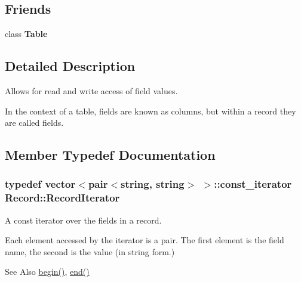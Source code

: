 \subsection*{Friends}
\begin{DoxyCompactItemize}
\item 
\hypertarget{class_record_af888815e80064bc9fa1035c6265da86e}{class {\bfseries Table}}\label{class_record_af888815e80064bc9fa1035c6265da86e}

\end{DoxyCompactItemize}


\subsection{Detailed Description}
Allows for read and write access of field values.

In the context of a table, fields are known as columns, but within a record they are called fields. 

\subsection{Member Typedef Documentation}
\hypertarget{class_record_ae8a1c90a4d896429d087ccc1f205f9b7}{
\subsubsection[{Record\-Iterator}]{\setlength{\rightskip}{0pt plus 5cm}typedef vector$<$pair$<$string, string$>$ $>$\-::const\-\_\-iterator {\bf Record\-::\-Record\-Iterator}}}\label{class_record_ae8a1c90a4d896429d087ccc1f205f9b7}
A const iterator over the fields in a record.

Each element accessed by the iterator is a pair. The first element is the field name, the second is the value (in string form.) \begin{DoxySeeAlso}{See Also}
\hyperlink{class_record_a4f65302d712b34e19b8bac9aeff06016}{begin()}, \hyperlink{class_record_a50ab91b0bb46a381cd3e3b297e4b9d9e}{end()} 
\end{DoxySeeAlso}


